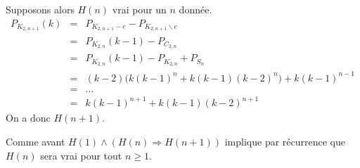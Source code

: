 \begin{itemize}
Supposons alors $H(n)$ vrai pour un $n$ donnée. 
\begin{eqnarray*}
P_{K_{2,n+1}}(k)			& = & P_{K_{2,n+1}-e} - P_{K_{2,n+1} \backslash{e}}				\\
							& = & P_{K_{2,n}}(k-1) - P_{C_{2,n}}							\\
							& = & P_{K_{2,n}}(k-1) - P_{K_{2,n}} + P_{S_n}					\\
							& = & (k-2)\big(k(k-1)^n + k(k-1)(k-2)^n\big) + k(k-1)^{n-1}	\\
							& = & \ldots													\\
							& = & k(k-1)^{n+1} + k(k-1)(k-2)^{n+1}
\end{eqnarray*}
On a donc $H(n+1)$.
\end{itemize}
Comme avant $H(1) \wedge (H(n) \Rightarrow H(n+1))$ implique par récurrence que $H(n)$ sera vrai pour tout $n \geq 1$.
